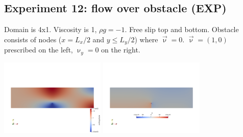 \newpage
\subsection*{Experiment 12: flow over obstacle (EXP)}

Domain is 4x1. Viscosity is 1, $\rho g = -1$. Free slip top and bottom.
Obstacle consists of nodes ($x=L_x/2$ and $y\le L_y/2$) where $\vec\upnu=0$. 
$\vec\upnu=(1,0)$ prescribed on the left, $\upnu_y=0$ on the right.

\begin{center}
\includegraphics[width=5cm]{python_codes/fieldstone_78/results/exp12/vel}
\includegraphics[width=5cm]{python_codes/fieldstone_78/results/exp12/p}
\end{center}

